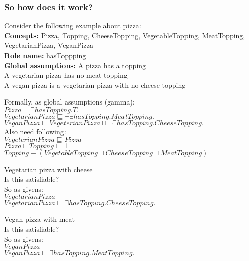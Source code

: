 \begin{frame}
  \frametitle{So how does it work?}
  Consider the following example about pizza: \\
  \pause
  \bigskip
  \textbf{Concepts:} Pizza, Topping, CheeseTopping, VegetableTopping, MeatTopping, VegetarianPizza, VeganPizza \\
  \textbf{Role name:} hasToppping \\
  \pause
  \bigskip
  \textbf {Global assumptions:} A pizza has a topping \\
  A vegetarian pizza has no meat topping \\
  A vegan pizza is a vegetarian pizza with no cheese topping
\end{frame}

\begin{frame}
   Formally, as global assumptions (gamma): \\
   \bigskip
   $Pizza \sqsubseteq \exists hasTopping.T.$ \\
   $VegetarianPizza \sqsubseteq \neg \exists hasTopping.MeatTopping.$  \\
   $VeganPizza \sqsubseteq VegeterianPizza \sqcap \neg \exists hasTopping.CheeseTopping.$  \\
   \pause
   \bigskip
   Also need following: \\
   \bigskip
   $VegeterianPizza \sqsubseteq Pizza$ \\
   $Pizza \sqcap Topping \sqsubseteq \bot$ \\
   $Topping \equiv (VegetableTopping \sqcup CheeseTopping \sqcup MeatTopping)$ \\
\end{frame}

\begin{frame}
   Vegetarian pizza with cheese\\
   Is this satisfiable? \\
   \pause
   \bigskip
   So as givens:\\
   $VegetarianPizza$ \\
   $VegetarianPizza \sqsubseteq \exists hasTopping.CheeseTopping.$  \\
\end{frame}   

\begin{frame}
   Vegan pizza with meat\\
   Is this satisfiable? \\
   \pause
   \bigskip
   So as givens:\\
   $VeganPizza$ \\
   $VeganPizza \sqsubseteq \exists hasTopping.MeatTopping.$  \\
\end{frame}


   
    
